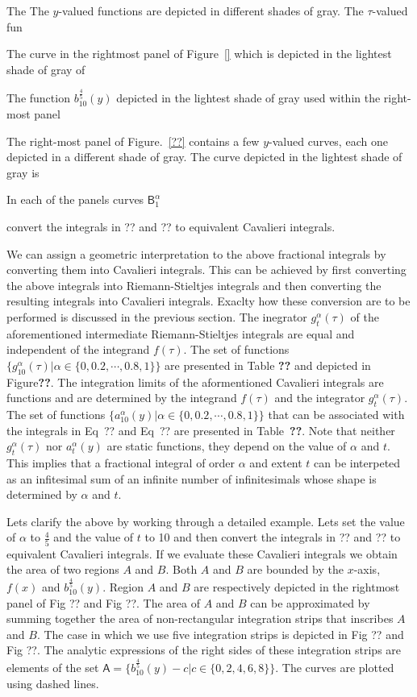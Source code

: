 \documentclass{article}
\theoremstyle{theorem}
\theoremstyle{definition}
\begin{document}
The The $y$-valued functions are depicted in different shades of gray. The $\tau$-valued fun 

The curve in the rightmost panel of 
Figure~\ref{} which is depicted in the lightest shade of gray of 

The function $b_{10}^{\frac{4}{5}}(y)$ 
depicted in the lightest shade of gray used within the right-most panel


The right-most panel of Figure.~\ref{??} contains 
a few $y$-valued curves, each one depicted in a different shade of gray. The curve depicted in the lightest shade of gray is  


In each of the panels  curves $\mathsf{B}_1^{\alpha}$

convert the 
integrals in ?? and ?? to equivalent Cavalieri integrals.


We can assign a geometric interpretation to the above fractional integrals by converting them into Cavalieri integrals. This can be achieved by first 
converting the above integrals into Riemann-Stieltjes integrals and then converting the resulting integrals into Cavalieri integrals. Exaclty how these conversion are 
to be performed is discussed in the previous section. The inegrator $g_t^{\alpha}(\tau)$ of the aforementioned intermediate Riemann-Stieltjes integrals are equal and independent of the integrand $f(\tau)$.
The set of functions $\{g_{10}^{\alpha}(\tau)|\alpha\in\{0,0.2,\cdots,0.8,1\}\}$ are presented in Table \textbf{??} and depicted in Figure\textbf{??}. The integration limits of the aformentioned Cavalieri 
integrals are functions and are determined by the integrand $f(\tau)$ and the integrator $g_t^{\alpha}(\tau)$. The set of functions $\{a_{10}^{\alpha}(y)|\alpha\in\{0,0.2,\cdots,0.8,1\}\}$ that can be 
associated with the integrals in Eq~{??} and Eq~{??} are presented in Table~\textbf{??}. Note that neither $g_t^{\alpha}(\tau)$ nor $a_t^{\alpha}(y)$ are static functions, 
they depend on the value of $\alpha$ and $t$. This implies that a fractional integral of order $\alpha$ and extent $t$ can be interpeted as an infitesimal sum of an infinite number of infinitesimals whose 
shape is determined by $\alpha$ and $t$.

Lets clarify the above by working through a detailed example. Lets set the value of $\alpha$ to $\frac{4}{5}$ and the value of $t$ to 10 and then convert the 
integrals in ?? and ?? to equivalent Cavalieri integrals. If we evaluate these Cavalieri integrals we obtain the area of two regions $A$ and $B$. Both $A$ and $B$ are bounded by the $x$-axis, 
$f(x)$ and $b_{10}^{\frac{4}{5}}(y)$. Region $A$ and $B$ are respectively depicted in the rightmost panel of Fig ?? and Fig ??. The area of $A$ and $B$ can be approximated
by summing together the area of non-rectangular integration strips that inscribes $A$ and $B$. The case in which we use five integration strips is depicted in 
Fig ?? and Fig ??. The analytic expressions of the right sides of these integration strips are elements of the set $\mathsf{A} = \{b_{10}^{\frac{4}{5}}(y) - c|c\in\{0,2,4,6,8\}\}$. The 
curves are plotted using dashed lines. 
\end{document}
